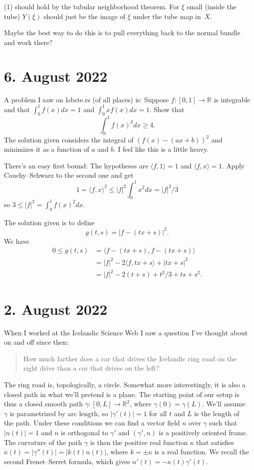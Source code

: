 \documentclass[11pt]{article}
\theoremstyle{definition}
\newcommand{\kk}[1]{\mathbb{#1}}
\begin{document}
(1) should hold by the tubular neighborhood theorem.
For $\xi$ small (inside the tube) $Y(\xi)$ should just be the image of $\xi$
under the tube map in~$X$.

Maybe the best way to do this is to pull everything back to the normal bundle
and work there?



\section*{6. August 2022}

A problem I saw on lobste.rs (of all places) is:
Suppose $f : [0,1] \to \kk R$ is integrable and that
$\int_0^1 f(x) dx = 1$ and $\int_0^1 xf(x) dx = 1$.
Show that
$$
\int_0^1 f(x)^2 dx \geq 4.
$$
The solution given considers the integral of $(f(x) - (ax + b))^2$ and minimizes
it as a function of $a$ and $b$.
I feel like this is a little heavy.

There's an easy first bound:
The hypotheses are $\langle f, 1 \rangle = 1$ and $\langle f, x \rangle = 1$.
Apply Cauchy--Schwarz to the second one and get
\[
1
= \langle f, x \rangle^2
\leq |f|^2 \int_0^1 x^2 dx
= |f|^2 / 3
\]
so $3 \leq |f|^2 = \int_0^1 f(x)^2 dx$.

The solution given is to define
$$
g(t,s) =
|f - (tx + s)|^2.
$$
We have
\begin{align*}
0 \leq g(t,s)
&= \langle f - (tx + s), f - (tx + s) \rangle
\\
&= |f|^2 - 2 \langle f, tx + s \rangle + |tx + s|^2
\\
&= |f|^2 - 2(t + s) + t^2/3 + ts + s^2.
\end{align*}





\section*{2. August 2022}

When I worked at the Icelandic Science Web I saw a question I've thought about
on and off since then:

\begin{quote}
How much farther does a car that drives the Icelandic ring road on the right
drive than a car that drives on the left?
\end{quote}

The ring road is, topologically, a circle.
Somewhat more interestingly, it is also a closed path in what we'll pretend is
a plane.
The starting point of our setup is thus a closed smooth path $\gamma : [0,L] \to
\kk R^2$, where $\gamma(0) = \gamma(L)$.
We'll assume $\gamma$ is parametrized by arc length, so $|\gamma'(t)| = 1$ for
all $t$ and $L$ is the length of the path.
Under these conditions we can find a vector field $n$ over $\gamma$ such that $|n(t)| = 1$
and $n$ is orthogonal to $\gamma'$ and $(\gamma', n)$ is a positively oriented
frame.
The curvature of the path $\gamma$ is then the positive real function $\kappa$ that
satisfies
$\kappa(t) = |\gamma''(t)| = |k(t) n(t)|$,
where $k = \pm \kappa$ is a real function.
We recall the second Frenet--Serret formula, which gives $n'(t) = -\kappa(t)
\gamma'(t)$.
\end{document}
